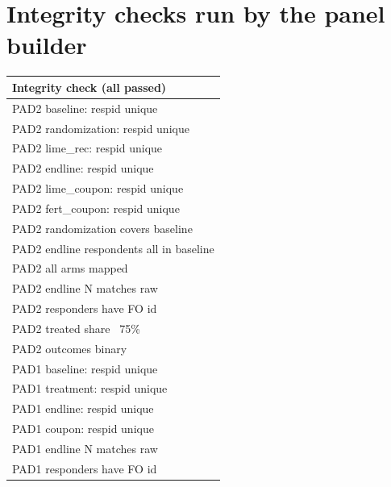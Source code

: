 \documentclass[11pt,a4paper]{article}
\begin{document}
\section{Integrity checks run by the panel builder}
\small\setlength{\tabcolsep}{6pt}\begin{center}\begin{tabular}{l}
\toprule
Integrity check (all passed) \\
\midrule
PAD2 baseline: respid unique \\
PAD2 randomization: respid unique \\
PAD2 lime\_rec: respid unique \\
PAD2 endline: respid unique \\
PAD2 lime\_coupon: respid unique \\
PAD2 fert\_coupon: respid unique \\
PAD2 randomization covers baseline \\
PAD2 endline respondents all in baseline \\
PAD2 all arms mapped \\
PAD2 endline N matches raw \\
PAD2 responders have FO id \\
PAD2 treated share ~75\% \\
PAD2 outcomes binary \\
PAD1 baseline: respid unique \\
PAD1 treatment: respid unique \\
PAD1 endline: respid unique \\
PAD1 coupon: respid unique \\
PAD1 endline N matches raw \\
PAD1 responders have FO id \\
\bottomrule
\end{tabular}\end{center}\normalsize
\end{document}
